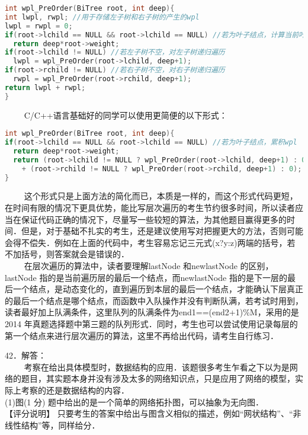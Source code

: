 \begin{lstlisting}[language=cpp]
int wpl_PreOrder(BiTree root, int deep){
int lwpl, rwpl; //用于存储左子树和右子树的产生的wpl
lwpl = rwpl = 0;
if(root->lchild == NULL && root->lchild == NULL) //若为叶子结点，计算当前叶子结点的wpl
  return deep*root->weight;
if(root->lchild != NULL) //若左子树不空，对左子树递归遍历
  lwpl = wpl_PreOrder(root->lchild, deep+1);
if(root->rchild != NULL) //若右子树不空，对右子树递归遍历
  rwpl = wpl_PreOrder(root->rchild, deep+1);
return lwpl + rwpl;
}
\end{lstlisting}
$\qquad$ C/C++语言基础好的同学可以使用更简便的以下形式：
\begin{lstlisting}[language=cpp]
int wpl_PreOrder(BiTree root, int deep){
if(root->lchild == NULL && root->lchild == NULL) //若为叶子结点，累积wpl
  return deep*root->weight;
  return (root->lchild != NULL ? wpl_PreOrder(root->lchild, deep+1) : 0)
    + (root->rchild != NULL ? wpl_PreOrder(root->rchild, deep+1) : 0);
}
\end{lstlisting}
$\qquad$ 这个形式只是上面方法的简化而已，本质是一样的，而这个形式代码更短，在时间有限的情况下更具优势，能比写层次遍历的考生节约很多时间，所以读者应当在保证代码正确的情况下，尽量写一些较短的算法，为其他题目赢得更多的时间．但是，对于基础不扎实的考生，还是建议使用写对把握更大的方法，否则可能会得不偿失．例如在上面的代码中，考生容易忘记三元式(x?y:z)两端的括号，若不加括号，则答案就会是错误的． \\
$\qquad$ 在层次遍历的算法中，读者要理解lastNode 和newlastNode 的区别，lastNode 指的是当前遍历层的最后一个结点，而newlastNode 指的是下一层的最后一个结点，是动态变化的，直到遍历到本层的最后一个结点，才能确认下层真正的最后一个结点是哪个结点，而函数中入队操作并没有判断队满，若考试时用到，读者最好加上队满条件，这里队列的队满条件为end1==(end2+1)\%M，采用的是2014 年真题选择题中第三题的队列形式．同时，考生也可以尝试使用记录每层的第一个结点来进行层次遍历的算法，这里不再给出代码，请考生自行练习．

42．解答： \\
$\qquad$ 考察在给出具体模型时，数据结构的应用．该题很多考生乍看之下以为是网络的题目，其实题本身并没有涉及太多的网络知识点，只是应用了网络的模型，实际上考察的还是数据结构的内容． \\

(1)图(1 分)
题中给出的是一个简单的网络拓扑图，可以抽象为无向图． \\
【评分说明】 只要考生的答案中给出与图含义相似的描述，例如“网状结构”、“非线性结构”等，同样给分．


